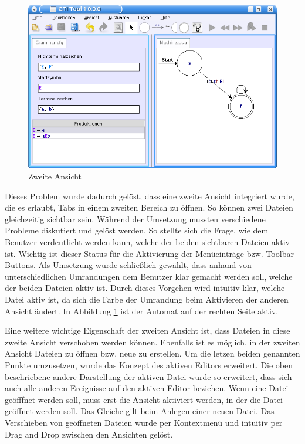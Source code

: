 \begin{figure}[h!]
\begin{center}
\includegraphics[width=12cm]{../images/second_view.png}
\caption{Zweite Ansicht}
\label{FigureSecondView}
\end{center}
\end{figure}
\vspace{10pt}

Dieses Problem wurde dadurch gelöst, dass eine zweite Ansicht integriert wurde,
die es erlaubt, Tabs in einem zweiten Bereich zu öffnen. So können zwei Dateien
gleichzeitig sichtbar sein. Während der Umsetzung mussten verschiedene Probleme
diskutiert und gelöst werden. So stellte sich die Frage, wie dem Benutzer
verdeutlicht werden kann, welche der beiden sichtbaren Dateien aktiv ist. Wichtig
ist dieser Status für die Aktivierung der Menüeinträge bzw. Toolbar Buttons. Als
Umsetzung wurde schließlich gewählt, dass anhand von unterschiedlichen
Umrandungen dem Benutzer klar gemacht werden soll, welche der beiden Dateien
aktiv ist. Durch dieses Vorgehen wird intuitiv klar, welche Datei aktiv ist, da
sich die Farbe der Umrandung beim Aktivieren der anderen Ansicht ändert. In
Abbildung \ref{FigureSecondView} ist der Automat auf der rechten Seite
aktiv.\vspace{10pt}

Eine weitere wichtige Eigenschaft der zweiten Ansicht ist, dass Dateien in diese
zweite Ansicht verschoben werden können. Ebenfalls ist es möglich, in der
zweiten Ansicht Dateien zu öffnen bzw. neue zu erstellen. Um die letzen beiden
genannten Punkte umzusetzen, wurde das Konzept des aktiven Editors erweitert. Die
oben beschriebene andere Darstellung der aktiven Datei wurde so erweitert, dass
sich auch alle anderen Ereignisse auf den aktiven Editor beziehen. Wenn eine
Datei geöfffnet werden soll, muss erst die Ansicht aktiviert werden, in der die
Datei geöffnet werden soll. Das Gleiche gilt beim Anlegen einer neuen Datei. Das
Verschieben von geöffneten Dateien wurde per Kontextmenü und intuitiv per Drag
and Drop zwischen den Ansichten gelöst.\vspace{10pt}


